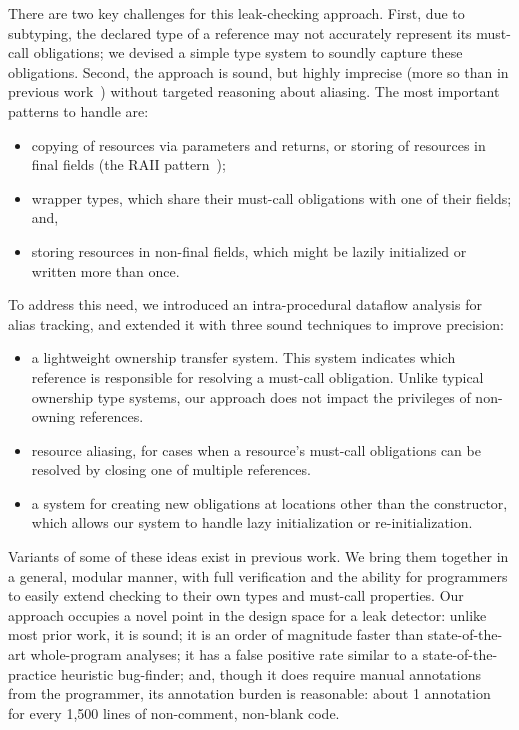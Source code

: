 There are two key challenges for this leak-checking approach.  First,
due to subtyping, the declared type of a reference may not accurately represent
its must-call obligations; we devised a simple type system to soundly capture
these obligations.  Second, the approach is sound, but highly imprecise (more so than in
previous work~\cite{KelloggRSSE2020}) without targeted reasoning about
aliasing.  The most important patterns to
handle are:
\begin{itemize}
\item copying of resources via parameters and returns, or storing of resources in
final fields (the RAII pattern~\cite{raii});
\item wrapper types, which share their must-call obligations with one of their fields; and,
\item storing resources in non-final fields, which might be lazily initialized or
  written more than once.
\end{itemize}
To address this need,
we introduced an intra-procedural
dataflow analysis for alias tracking, and extended it with three sound
techniques to improve precision:
\begin{itemize}
\item a lightweight ownership transfer system. This system
  indicates which reference is responsible for resolving a must-call
  obligation. Unlike typical ownership type systems, our approach does
  not impact the privileges of non-owning references.
\item resource aliasing, for cases
  when
  a resource's must-call obligations
  can be resolved by closing one of multiple references.
\item a system for creating new obligations at locations other than the
  constructor, which allows our system to handle lazy initialization or re-initialization.
\end{itemize}
Variants of some of these ideas exist in previous work.  We bring
them together in a general, modular manner, with full verification and
the ability for programmers to easily extend checking to their own
types and must-call properties.
%
Our approach occupies a novel point in the design space for a leak detector:
unlike most prior work, it is sound; it is an order of magnitude faster than
state-of-the-art whole-program analyses; it has a false positive rate similar
to a state-of-the-practice heuristic bug-finder; and, though it does require manual
annotations from the programmer, its annotation burden is reasonable: about
1 annotation for every 1,500 lines of non-comment, non-blank code. 

